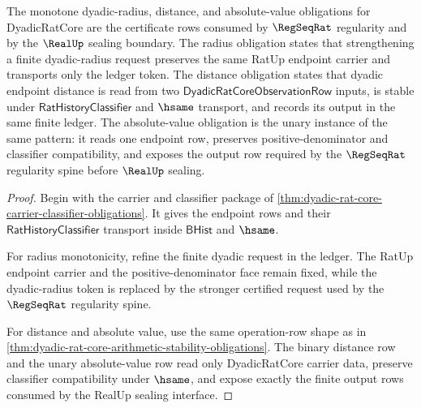 \begin{theorem}
\label{thm:dyadic-rat-core-radius-distance-obligations}
The monotone dyadic-radius, distance, and absolute-value obligations for
DyadicRatCore are the certificate rows consumed by $\RegSeqRat$ regularity and
by the $\RealUp$ sealing boundary. The radius obligation states that
strengthening a finite dyadic-radius request preserves the same RatUp endpoint
carrier and transports only the ledger token. The distance obligation states
that dyadic endpoint distance is read from two
$\mathsf{DyadicRatCoreObservationRow}$ inputs, is stable under
$\mathsf{RatHistoryClassifier}$ and $\hsame$ transport, and records its output
in the same finite ledger. The absolute-value obligation is the unary instance
of the same pattern: it reads one endpoint row, preserves positive-denominator
and classifier compatibility, and exposes the output row required by the
$\RegSeqRat$ regularity spine before $\RealUp$ sealing.
\end{theorem}
\begin{proof}
Begin with the carrier and classifier package of
\autoref{thm:dyadic-rat-core-carrier-classifier-obligations}. It gives the
endpoint rows and their $\mathsf{RatHistoryClassifier}$ transport inside
$\mathsf{BHist}$ and $\hsame$.

For radius monotonicity, refine the finite dyadic request in the ledger. The
RatUp endpoint carrier and the positive-denominator face remain fixed, while
the dyadic-radius token is replaced by the stronger certified request used by
the $\RegSeqRat$ regularity spine.

For distance and absolute value, use the same operation-row shape as in
\autoref{thm:dyadic-rat-core-arithmetic-stability-obligations}. The binary
distance row and the unary absolute-value row read only DyadicRatCore carrier
data, preserve classifier compatibility under $\hsame$, and expose exactly the
finite output rows consumed by the RealUp sealing interface.
\end{proof}

